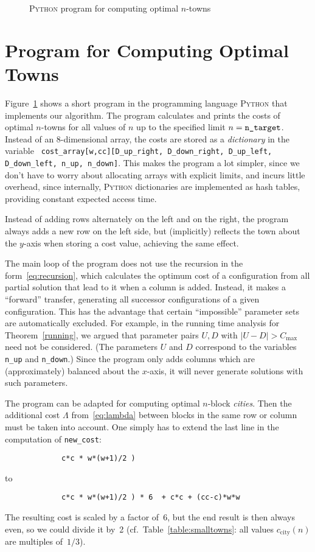 \documentclass[preprint,authoryear,12pt]{elsarticle}
\newcommand{\abs}[1]{\lvert #1 \rvert}
\begin{document}
\begin{figure}
  \caption{\textsc{Python} program for computing optimal $n$-towns}
  \label{fig:program}
\end{figure}

\section{Program for Computing Optimal Towns}
\label{code}
Figure~\ref{fig:program} shows a short program in the programming language \textsc{Python} that
implements our algorithm.
The program calculates and prints the costs of optimal $n$-towns for
all values of $n$
up to the specified limit $n=\verb:n_target:$.
  Instead of an 8-dimensional array, the
costs are stored as a \emph{dictionary} in the variable
{\tt
\verb:cost_array:[\verb:w:,\verb:cc:][\verb:D_up_right:, \verb:D_down_right:, \verb:D_up_left:, \verb:D_down_left:,
       \verb:n_up:, \verb:n_down:]}.
This makes the program a lot simpler, since we don't have to worry about
allocating arrays with explicit limits, and
 incurs little overhead, since internally, \textsc{Python} dictionaries
are implemented as hash tables, providing constant expected access time.

Instead of adding rows alternately on the left and on the right, the
program always adds a new row on the left side, but (implicitly) reflects
the town about the $y$-axis when storing a cost value, achieving the
same effect.

The main loop of the program does not use the recursion in the
form~\eqref{eq:recursion}, which calculates the optimum cost of a
configuration from all partial solution that lead to it when a column
is added.  Instead, it makes a ``forward'' transfer, generating
all successor configurations of a given configuration.  This has the
advantage that certain ``impossible'' parameter sets are automatically
excluded.  For example, in the running time analysis for
Theorem~\ref{running}, we argued that parameter pairs $U,D$ with
$\abs{U-D}>C_{\max}$ need not be considered.
(The parameters $U$ and $D$ correspond to the variables \verb:n_up: and \verb:n_down:.)
 Since the program only
adds columns which are (approximately) balanced about the $x$-axis,
it will never generate solutions with such parameters.

The program can be adapted for computing optimal $n$-block
\emph{cities}. Then the additional cost $\Lambda$
{from}~\eqref{eq:lambda}
 between blocks in the same row or column must be
taken into account.  One simply has to extend the last line in the
computation of \verb:new_cost::
{\small
\begin{verbatim}
             c*c * w*(w+1)/2 )
\end{verbatim}
}\noindent to
{\small
\begin{verbatim}
             c*c * w*(w+1)/2 ) * 6  + c*c + (cc-c)*w*w
\end{verbatim}
\noindent}The resulting cost is scaled by a factor of~6, but the
end result is then always even, so we could divide it by~2
(cf.~Table~\ref{table:smalltowns}: all values $c_{\textrm{city}}(n)$ are multiples
of~$1/3$).
\end{document}
